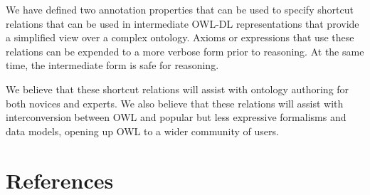 \documentclass{llncs}
\begin{document}
We have defined two annotation properties that can be used to specify
shortcut relations that can be used in intermediate OWL-DL
representations that provide a simplified view over a complex
ontology. Axioms or expressions that use these relations can be
expended to a more verbose form prior to reasoning. At the same time,
the intermediate form is safe for reasoning.

We believe that these shortcut relations will assist with ontology
authoring for both novices and experts. We also believe that these
relations will assist with interconversion between OWL and popular but
less expressive formalisms and data models, opening up OWL to a wider
community of users.

\section{References}



\end{document}
